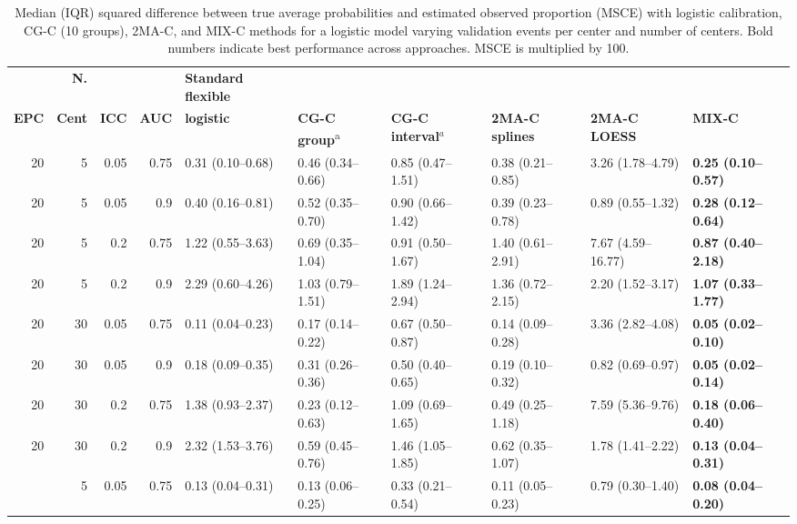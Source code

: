 \begin{table}
\centering
\footnotesize
\setlength{\tabcolsep}{4pt}
\begin{threeparttable}
\caption[Median MSCE for varying validation sample size]{Median (IQR) squared difference between true average probabilities and estimated observed proportion (MSCE) with logistic calibration, CG-C (10 groups), 2MA-C, and MIX-C methods for a logistic model varying validation events per center and number of centers. Bold numbers indicate best performance across approaches. MSCE is multiplied by 100. }
\label{tab:4:2}
\begin{tabular}{rrrr llllll}
\toprule
 & \textbf{N.} & & & \textbf{Standard flexible} & & & & & \\
\textbf{EPC} & \textbf{Cent} & \textbf{ICC} & \textbf{AUC} & \textbf{logistic} & \textbf{CG-C group}\textsuperscript{a} & \textbf{CG-C interval}$^a$ & \textbf{2MA-C splines} & \textbf{2MA-C LOESS} & \textbf{MIX-C} \\
\midrule
20 & 5 & 0.05 & 0.75 & 0.31 (0.10--0.68) & 0.46 (0.34--0.66) & 0.85 (0.47--1.51) & 0.38 (0.21--0.85) & 3.26 (1.78--4.79) & \textbf{0.25 (0.10--0.57)} \\
20 & 5 & 0.05 & 0.9 & 0.40 (0.16--0.81) & 0.52 (0.35--0.70) & 0.90 (0.66--1.42) & 0.39 (0.23--0.78) & 0.89 (0.55--1.32) & \textbf{0.28 (0.12--0.64)} \\
20 & 5 & 0.2 & 0.75 & 1.22 (0.55--3.63) & 0.69 (0.35--1.04) & 0.91 (0.50--1.67) & 1.40 (0.61--2.91) & 7.67 (4.59--16.77) & \textbf{0.87 (0.40--2.18)} \\
20 & 5 & 0.2 & 0.9 & 2.29 (0.60--4.26) & 1.03 (0.79--1.51) & 1.89 (1.24--2.94) & 1.36 (0.72--2.15) & 2.20 (1.52--3.17) & \textbf{1.07 (0.33--1.77)} \\
20 & 30 & 0.05 & 0.75 & 0.11 (0.04--0.23) & 0.17 (0.14--0.22) & 0.67 (0.50--0.87) & 0.14 (0.09--0.28) & 3.36 (2.82--4.08) & \textbf{0.05 (0.02--0.10)} \\
20 & 30 & 0.05 & 0.9 & 0.18 (0.09--0.35) & 0.31 (0.26--0.36) & 0.50 (0.40--0.65) & 0.19 (0.10--0.32) & 0.82 (0.69--0.97) & \textbf{0.05 (0.02--0.14)} \\
20 & 30 & 0.2 & 0.75 & 1.38 (0.93--2.37) & 0.23 (0.12--0.63) & 1.09 (0.69--1.65) & 0.49 (0.25--1.18) & 7.59 (5.36--9.76) & \textbf{0.18 (0.06--0.40)} \\
20 & 30 & 0.2 & 0.9 & 2.32 (1.53--3.76) & 0.59 (0.45--0.76) & 1.46 (1.05--1.85) & 0.62 (0.35--1.07) & 1.78 (1.41--2.22) & \textbf{0.13 (0.04--0.31)} \\
\addlinespace
200 & 5 & 0.05 & 0.75 & 0.13 (0.04--0.31) & 0.13 (0.06--0.25) & 0.33 (0.21--0.54) & 0.11 (0.05--0.23) & 0.79 (0.30--1.40) & \textbf{0.08 (0.04--0.20)} \\

\end{tabular}
\end{threeparttable}
\end{table}
